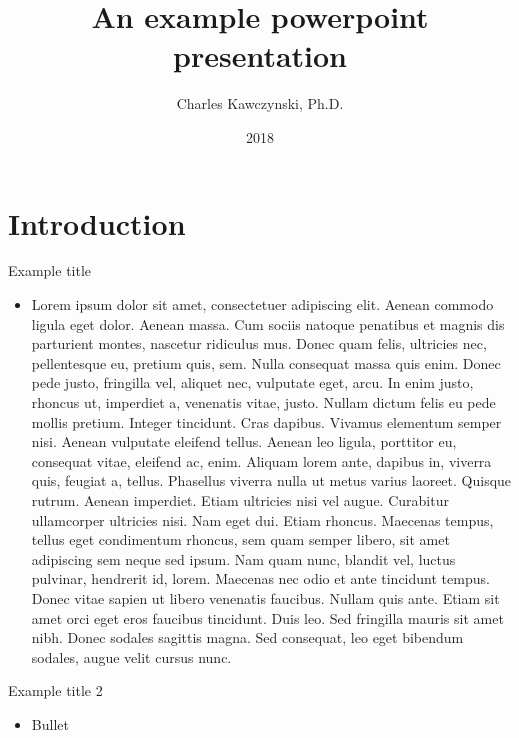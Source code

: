 \documentclass{beamer}
\title[An example PPT]{An example powerpoint presentation}
\author[C. Kawczynski]{
  \texorpdfstring{\CE
  Charles Kawczynski, Ph.D.
  \\
  }{
  Charles Kawczynski
  }
}
\date[Short Occasion]{2018}
\newcommand{\rootdir}{.}
\newcommand{\figdir}{\rootdir/figs}
\begin{document}
\section{Introduction}

\begin{frame}{Example title}
  \begin{itemize}
    \item Lorem ipsum dolor sit amet, consectetuer adipiscing elit. Aenean commodo ligula eget dolor. Aenean massa. Cum sociis natoque penatibus et magnis dis parturient montes, nascetur ridiculus mus. Donec quam felis, ultricies nec, pellentesque eu, pretium quis, sem. Nulla consequat massa quis enim. Donec pede justo, fringilla vel, aliquet nec, vulputate eget, arcu. In enim justo, rhoncus ut, imperdiet a, venenatis vitae, justo. Nullam dictum felis eu pede mollis pretium. Integer tincidunt. Cras dapibus. Vivamus elementum semper nisi. Aenean vulputate eleifend tellus. Aenean leo ligula, porttitor eu, consequat vitae, eleifend ac, enim. Aliquam lorem ante, dapibus in, viverra quis, feugiat a, tellus. Phasellus viverra nulla ut metus varius laoreet. Quisque rutrum. Aenean imperdiet. Etiam ultricies nisi vel augue. Curabitur ullamcorper ultricies nisi. Nam eget dui. Etiam rhoncus. Maecenas tempus, tellus eget condimentum rhoncus, sem quam semper libero, sit amet adipiscing sem neque sed ipsum. Nam quam nunc, blandit vel, luctus pulvinar, hendrerit id, lorem. Maecenas nec odio et ante tincidunt tempus. Donec vitae sapien ut libero venenatis faucibus. Nullam quis ante. Etiam sit amet orci eget eros faucibus tincidunt. Duis leo. Sed fringilla mauris sit amet nibh. Donec sodales sagittis magna. Sed consequat, leo eget bibendum sodales, augue velit cursus nunc.
  \end{itemize}
\end{frame}

\begin{frame}{Example title 2}
  \MP{.39\TW}
  \begin{itemize}
    \item Bullet
  \end{itemize}
  \EMP
  \MP{.6\TW}
    \MP{\TW} \CE \vspace{-1em}
    \IG[width=.99\TW]{\figdir/UCLA/logo_MAE.png} \\
    \EMP \\
  \EMP
\end{frame}
\end{document}
